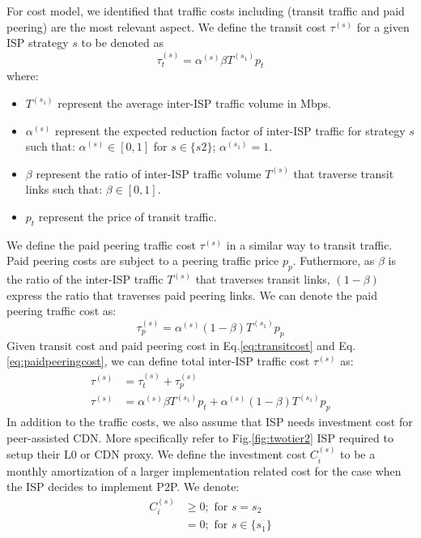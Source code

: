 \documentclass[paper]{ieice}
\begin{document}
For cost model, we identified that traffic costs including (transit traffic and paid peering) are the most relevant aspect. 
We define the transit cost $\tau^{(s)}$ for a given ISP strategy $s$ to be denoted as 
\begin{equation}\label{eq:transitcost}
	\tau^{(s)}_t = \alpha^{(s)} \beta T^{(s_1)} p_t
\end{equation}
where:
\begin{itemize}
	\item $T^{(s_1)}$ represent the average inter-ISP traffic volume in Mbps.
	\item $\alpha^{(s)}$ represent the expected reduction factor of inter-ISP traffic for strategy $s$ such that: $\alpha^{(s)} \in [0,1]$ for $s \in \{s2\}$;  $\alpha^{(s_1)} = 1$.
	\item $\beta$ represent the ratio of inter-ISP traffic volume $T^{(s)}$ that traverse transit links such that: $\beta \in [0,1]$.
	\item $p_t$ represent the price of transit traffic.
\end{itemize}
We define the paid peering traffic cost $\tau^{(s)}$ in a similar way to transit traffic. 
Paid peering costs are subject to a peering traffic price $p_p$.
Futhermore, as $\beta$ is the ratio of the inter-ISP traffic $T^{(s)}$ that traverses transit links, $(1-\beta)$ express the ratio that traverses paid peering links.
We can denote the paid peering traffic cost as:
\begin{equation}\label{eq:paidpeeringcost}
	\tau^{(s)}_p = \alpha^{(s)} (1-\beta) T^{(s_1)} p_p
\end{equation}
Given transit cost and paid peering cost in Eq.\ref{eq:transitcost} and Eq.\ref{eq:paidpeeringcost}, we can define total inter-ISP traffic cost $\tau^{(s)}$ as:
\begin{align}
	\tau^{(s)} &= \tau^{(s)}_t + \tau^{(s)}_p \\
	\tau^{(s)} &= \alpha^{(s)} \beta T^{(s_1)} p_t + \alpha^{(s)} (1-\beta) T^{(s_1)} p_p
\end{align}
In addition to the traffic costs, we also assume that ISP needs investment cost for peer-assisted CDN.
More specifically refer to Fig.\ref{fig:twotier2} ISP required to setup their L0 or CDN proxy.
We define the investment cost $C^{(s)}_i$ to be a monthly amortization of a larger implementation related cost for the case when the ISP decides to implement P2P. 
We denote:
\begin{align}
	C^{(s)}_i &\ge 0; \text{ for } s = s_2 \\
	          &= 0; \text{ for } s \in \{s_1\}
\end{align}
\end{document}
